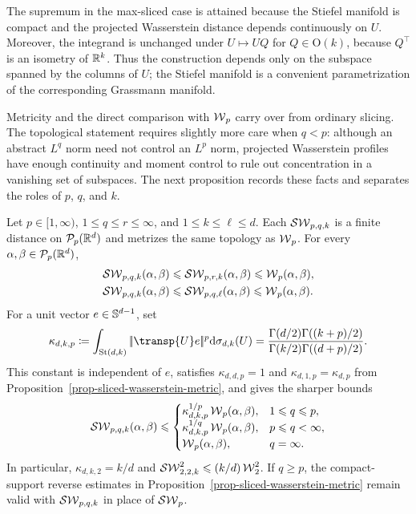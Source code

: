 The supremum in the max-sliced case is attained because the Stiefel manifold
is compact and the projected Wasserstein distance depends continuously on
$U$. Moreover, the integrand is unchanged under $U\mapsto UQ$ for
$Q\in\mathrm O(k)$, because $Q^\top$ is an isometry of $\mathbb{R}^k$. Thus the
construction depends only on the subspace spanned by the columns of $U$; the
Stiefel manifold is a convenient parametrization of the corresponding
Grassmann manifold.

Metricity and the direct comparison with $\operatorname{\mathcal{W}}_p$ carry over from ordinary
slicing. The topological statement requires slightly more care when $q<p$:
although an abstract $L^q$ norm need not control an $L^p$ norm, projected
Wasserstein profiles have enough continuity and moment control to rule out
concentration in a vanishing set of subspaces. The next proposition records
these facts and separates the roles of $p$, $q$, and $k$.

\begin{prop}\label{prop-sliced-variant-bounds}
	Let $p\in[1,\infty)$, $1\leq q\leq r\leq\infty$, and
	$1\leq k\leq \ell\leq d$. Each $\operatorname{\mathcal{SW}}_{p,q,k}$ is a finite distance on
	$\mathcal{P}_p(\mathbb{R}^d)$ and metrizes the same topology as $\operatorname{\mathcal{W}}_p$. For every
	$\alpha,\beta\in\mathcal{P}_p(\mathbb{R}^d)$,
	\begin{align}
		\operatorname{\mathcal{SW}}_{p,q,k}(\alpha,\beta)
		&\leqslant
		\operatorname{\mathcal{SW}}_{p,r,k}(\alpha,\beta)
		\leqslant
		\operatorname{\mathcal{W}}_p(\alpha,\beta),
		\label{eq-lq-sliced-monotonicity}\\
		\operatorname{\mathcal{SW}}_{p,q,k}(\alpha,\beta)
		&\leqslant
		\operatorname{\mathcal{SW}}_{p,q,\ell}(\alpha,\beta)
		\leqslant
		\operatorname{\mathcal{W}}_p(\alpha,\beta).
		\label{eq-subspace-dimension-monotonicity}
	\end{align}
	For a unit vector $e\in\mathbb{S}^{d-1}$, set
	\[
		\kappa_{d,k,p}
		\eqdef
		\int_{\mathrm{St}(d,k)}\norm{\transp{U}e}^p\d\sigma_{d,k}(U)
		=
		\frac{\Gamma(d/2)\Gamma((k+p)/2)}
		     {\Gamma(k/2)\Gamma((d+p)/2)}.
	\]
	This constant is independent of $e$, satisfies $\kappa_{d,d,p}=1$ and
	$\kappa_{d,1,p}=\kappa_{d,p}$ from
	Proposition~\ref{prop-sliced-wasserstein-metric}, and gives the sharper bounds
	\begin{equation}\label{eq-lq-subspace-sliced-upper-bound}
		\operatorname{\mathcal{SW}}_{p,q,k}(\alpha,\beta)
		\leqslant
		\begin{cases}
			\kappa_{d,k,p}^{1/p}\operatorname{\mathcal{W}}_p(\alpha,\beta), & 1\leqslant q\leqslant p,\\
			\kappa_{d,k,p}^{1/q}\operatorname{\mathcal{W}}_p(\alpha,\beta), & p\leqslant q<\infty,\\
			\operatorname{\mathcal{W}}_p(\alpha,\beta), & q=\infty.
		\end{cases}
	\end{equation}
	In particular, $\kappa_{d,k,2}=k/d$ and
	$\operatorname{\mathcal{SW}}_{2,2,k}^2\leqslant(k/d)\operatorname{\mathcal{W}}_2^2$. If $q\geq p$, the compact-support reverse
	estimates in Proposition~\ref{prop-sliced-wasserstein-metric} remain valid
	with $\operatorname{\mathcal{SW}}_{p,q,k}$ in place of $\operatorname{\mathcal{SW}}_p$.
\end{prop}

